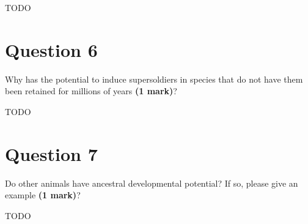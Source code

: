 \documentclass[letterpaper,12pt]{article}
\newenvironment{myindentpar}[1]%
{\begin{list}{}%
          {\setlength{\leftmargin}{#1}}%
          \item[]%
}
{\end{list}}
\begin{document}
\begin{myindentpar}{0.5cm}
TODO
\end{myindentpar}


\section{Question 6}

Why has the potential to induce supersoldiers in species that do not have them been retained for millions of years \textbf{(1 mark)}?
\vspace*{20px}

\begin{myindentpar}{0.5cm}
TODO
\end{myindentpar}



\section{Question 7}

Do other animals have ancestral developmental potential? If so, please give an example \textbf{(1 mark)}?
\vspace*{20px}

\begin{myindentpar}{0.5cm}
TODO
\end{myindentpar}
\end{document}
